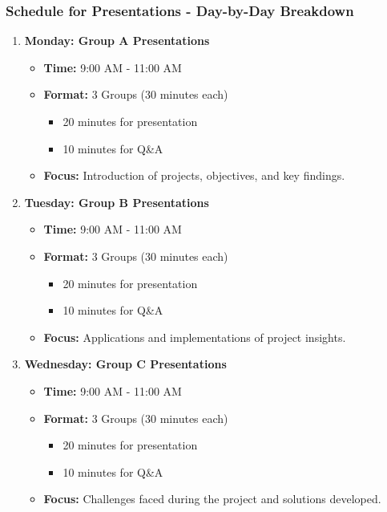 \documentclass[aspectratio=169]{beamer}
\begin{document}
\begin{frame}[fragile]
    \frametitle{Schedule for Presentations - Day-by-Day Breakdown}
    \begin{enumerate}
        \item \textbf{Monday: Group A Presentations}
            \begin{itemize}
                \item \textbf{Time:} 9:00 AM - 11:00 AM
                \item \textbf{Format:} 3 Groups (30 minutes each)
                    \begin{itemize}
                        \item 20 minutes for presentation
                        \item 10 minutes for Q\&A
                    \end{itemize}
                \item \textbf{Focus:} Introduction of projects, objectives, and key findings.
            \end{itemize}
        
        \item \textbf{Tuesday: Group B Presentations}
            \begin{itemize}
                \item \textbf{Time:} 9:00 AM - 11:00 AM
                \item \textbf{Format:} 3 Groups (30 minutes each)
                    \begin{itemize}
                        \item 20 minutes for presentation
                        \item 10 minutes for Q\&A
                    \end{itemize}
                \item \textbf{Focus:} Applications and implementations of project insights.
            \end{itemize}
        
        \item \textbf{Wednesday: Group C Presentations}
            \begin{itemize}
                \item \textbf{Time:} 9:00 AM - 11:00 AM
                \item \textbf{Format:} 3 Groups (30 minutes each)
                    \begin{itemize}
                        \item 20 minutes for presentation
                        \item 10 minutes for Q\&A
                    \end{itemize}
                \item \textbf{Focus:} Challenges faced during the project and solutions developed.
            \end{itemize}
    \end{enumerate}
\end{frame}
\end{document}
